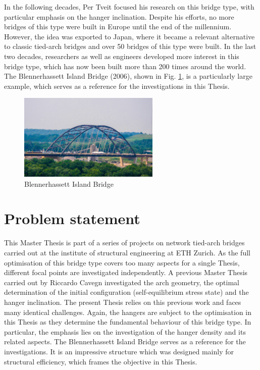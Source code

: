 In the following decades, Per Tveit focused his research on this bridge type, with particular emphasis on the hanger inclination. Despite his efforts, no more bridges of this type were built in Europe until the end of the millennium. However, the idea was exported to Japan, where it became a relevant alternative to classic tied-arch bridges and over 50 bridges of this type were built. In the last two decades, researchers as well as engineers developed more interest in this bridge type, which has now been built more than 200 times around the world. The Blennerhassett Island Bridge (2006), shown in Fig. \ref{fig:Blennerhassett}, is a particularly large example, which serves as a reference for the investigations in this Thesis.

\begin{figure}[H]
    \centering
    \includegraphics[width=0.6\textwidth]{overleaf/Pictures/Blennerhassett.jpg}
    \caption{Blennerhassett Island Bridge \cite{Blennerhassett}}
    \label{fig:Blennerhassett}
\end{figure}

\section{Problem statement} \label{sec:int_prob}
This Master Thesis is part of a series of projects on network tied-arch bridges carried out at the institute of structural engineering at ETH Zurich. As the full optimisation of this bridge type covers too many aspects for a single Thesis, different focal points are investigated independently. A previous Master Thesis carried out by Riccardo Cavegn investigated the arch geometry, the optimal determination of the initial configuration (self-equilibrium stress state) and the hanger inclination. The present Thesis relies on this previous work and faces many identical challenges. Again, the hangers are subject to the optimisation in this Thesis as they determine the fundamental behaviour of this bridge type. In particular, the emphasis lies on the investigation of the hanger density and its related aspects. The Blennerhassett Island Bridge serves as a reference for the investigations. It is an impressive structure which was designed mainly for structural efficiency, which frames the objective in this Thesis.  

